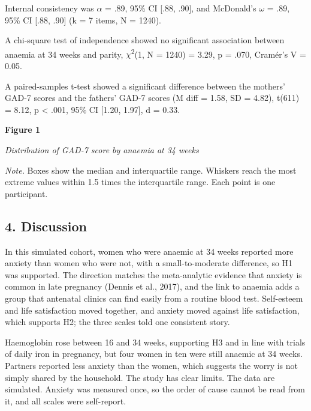 \documentclass[12pt]{article}
\begin{document}
Internal consistency was \ensuremath{\alpha} = .89, 95\% CI [.88, .90], and McDonald's \ensuremath{\omega} = .89, 95\% CI [.88, .90] (k = 7 items, N = 1240).

A chi-square test of independence showed no significant association between anaemia at 34 weeks and parity, \ensuremath{\chi}\textsuperscript{2}(1, N = 1240) = 3.29, p = .070, Cramér's V = 0.05.

A paired-samples t-test showed a significant difference between the mothers' GAD-7 scores and the fathers' GAD-7 scores (M diff = 1.58, SD = 4.82), t(611) = 8.12, p < .001, 95\% CI [1.20, 1.97], d = 0.33.

\textbf{Figure 1}

\textit{Distribution of GAD-7 score by anaemia at 34 weeks}


\textit{Note.} Boxes show the median and interquartile range. Whiskers reach the most extreme values within 1.5 times the interquartile range. Each point is one participant.

\newline{}

\subsection{4. Discussion}

In this simulated cohort, women who were anaemic at 34 weeks reported more anxiety than women who were not, with a small-to-moderate difference, so H1 was supported. The direction matches the meta-analytic evidence that anxiety is common in late pregnancy (Dennis et al., 2017), and the link to anaemia adds a group that antenatal clinics can find easily from a routine blood test. Self-esteem and life satisfaction moved together, and anxiety moved against life satisfaction, which supports H2; the three scales told one consistent story.

Haemoglobin rose between 16 and 34 weeks, supporting H3 and in line with trials of daily iron in pregnancy, but four women in ten were still anaemic at 34 weeks. Partners reported less anxiety than the women, which suggests the worry is not simply shared by the household. The study has clear limits. The data are simulated. Anxiety was measured once, so the order of cause cannot be read from it, and all scales were self-report.
\end{document}

